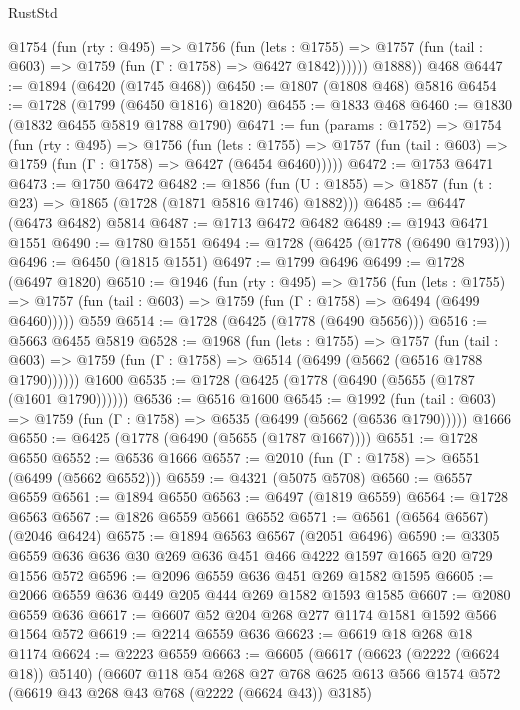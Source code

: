 \begin{lexlean}{RustStd}
\begin{coremodule}
{\begin{coremodule}
{{{{{{{{{{{{{          @1754
            (fun (rty : @495) =>
            @1756
              (fun (lets : @1755) =>
              @1757 (fun (tail : @603) => @1759 (fun (Γ : @1758) => @6427 @1842))))))
        @1888))
    @468
@6447 := @1894 (@6420 (@1745 @468))
@6450 := @1807 (@1808 @468) @5816
@6454 := @1728 (@1799 (@6450 @1816) @1820)
@6455 := @1833 @468
@6460 := @1830 (@1832 @6455 @5819 @1788 @1790)
@6471 := fun (params : @1752) =>
  @1754
    (fun (rty : @495) =>
    @1756
      (fun (lets : @1755) =>
      @1757 (fun (tail : @603) => @1759 (fun (Γ : @1758) => @6427 (@6454 @6460)))))
@6472 := @1753 @6471
@6473 := @1750 @6472
@6482 := @1856 (fun (U : @1855) => @1857 (fun (t : @23) => @1865 (@1728 (@1871 @5816 @1746) @1882)))
@6485 := @6447 (@6473 @6482) @5814
@6487 := @1713 @6472 @6482
@6489 := @1943 @6471 @1551
@6490 := @1780 @1551
@6494 := @1728 (@6425 (@1778 (@6490 @1793)))
@6496 := @6450 (@1815 @1551)
@6497 := @1799 @6496
@6499 := @1728 (@6497 @1820)
@6510 := @1946
    (fun (rty : @495) =>
    @1756
      (fun (lets : @1755) =>
      @1757 (fun (tail : @603) => @1759 (fun (Γ : @1758) => @6494 (@6499 @6460)))))
    @559
@6514 := @1728 (@6425 (@1778 (@6490 @5656)))
@6516 := @5663 @6455 @5819
@6528 := @1968
    (fun (lets : @1755) =>
    @1757
      (fun (tail : @603) => @1759 (fun (Γ : @1758) => @6514 (@6499 (@5662 (@6516 @1788 @1790))))))
    @1600
@6535 := @1728 (@6425 (@1778 (@6490 (@5655 (@1787 (@1601 @1790))))))
@6536 := @6516 @1600
@6545 := @1992
    (fun (tail : @603) => @1759 (fun (Γ : @1758) => @6535 (@6499 (@5662 (@6536 @1790)))))
    @1666
@6550 := @6425 (@1778 (@6490 (@5655 (@1787 @1667))))
@6551 := @1728 @6550
@6552 := @6536 @1666
@6557 := @2010 (fun (Γ : @1758) => @6551 (@6499 (@5662 @6552)))
@6559 := @4321 (@5075 @5708)
@6560 := @6557 @6559
@6561 := @1894 @6550
@6563 := @6497 (@1819 @6559)
@6564 := @1728 @6563
@6567 := @1826 @6559 @5661 @6552
@6571 := @6561 (@6564 @6567) (@2046 @6424)
@6575 := @1894 @6563 @6567 (@2051 @6496)
@6590 := @3305 @6559 @636 @636 @30 @269 @636 @451 @466 @4222 @1597 @1665 @20 @729 @1556 @572
@6596 := @2096 @6559 @636 @451 @269 @1582 @1595
@6605 := @2066 @6559 @636 @449 @205 @444 @269 @1582 @1593 @1585
@6607 := @2080 @6559 @636
@6617 := @6607 @52 @204 @268 @277 @1174 @1581 @1592 @566 @1564 @572
@6619 := @2214 @6559 @636
@6623 := @6619 @18 @268 @18 @1174
@6624 := @2223 @6559
@6663 := @6605
    (@6617
      (@6623 (@2222 (@6624 @18)) @5140)
      (@6607
        @118
        @54
        @268
        @27
        @768
        @625
        @613
        @566
        @1574
        @572
        (@6619 @43 @268 @43 @768 (@2222 (@6624 @43)) @3185)
}}}}}}}}}}}}}
\end{coremodule}}
\end{coremodule}
\end{lexlean}
